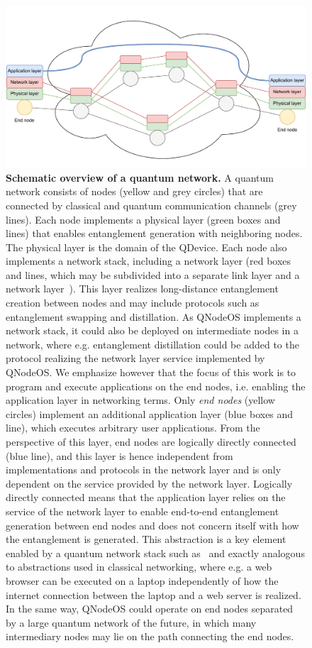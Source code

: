 \begin{figure}[h]
    \centering
    \includegraphics[width=\linewidth]{figures/qnodeos/supplementary/network_nodes.pdf}
    \caption{
        \textbf{Schematic overview of a quantum network.}
        A quantum network consists of nodes (yellow and grey circles) that are connected by classical and quantum communication channels (grey lines). Each node implements a physical layer (green boxes and lines) that enables entanglement generation with neighboring nodes. The physical layer is the domain of the QDevice. Each node also implements a network stack, including a network layer (red boxes and lines, which may be subdivided into a separate link layer and a network layer~\cite{dahlberg_2019_egp, kozlowski_2019_towards}). This layer realizes long-distance entanglement creation between nodes and may include protocols such as entanglement swapping and distillation. As QNodeOS implements a network stack, it could also be deployed on intermediate nodes in a network, where e.g. entanglement distillation could be added to the protocol realizing the network layer service implemented by QNodeOS.  \newline
        We emphasize however that the focus of this work is to program and execute applications on the end nodes, i.e. enabling the application layer in networking terms. Only \emph{end nodes} (yellow circles) implement an additional application layer (blue boxes and line), which executes arbitrary user applications. From the perspective of this layer, end nodes are logically directly connected (blue line), and this layer is hence independent from implementations and protocols in the network layer and is only dependent on the service  provided by the network layer. Logically directly connected means that the application layer relies on the service of the network layer to enable end-to-end entanglement generation between end nodes and does not concern itself with how the entanglement is generated. This abstraction is a key element enabled by a quantum network stack such as~\cite{dahlberg_2019_egp} and exactly analogous to abstractions used in classical networking, where e.g. a web browser can be executed on a laptop independently of how the internet connection between the laptop and a web server is realized. In the same way, QNodeOS could operate on end nodes separated by a large quantum network of the future, in which many intermediary nodes may lie on the path connecting the end nodes.}
        

\end{figure}
